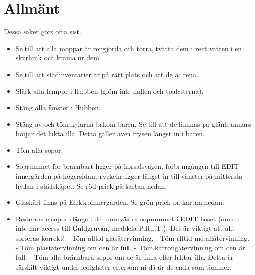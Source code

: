 \section{Allmänt}
Dessa saker görs ofta sist.
\begin{itemize}
    \item Se till att alla moppar är rengjorda och torra, tvätta dem i rent vatten i en skurhink och krama ur dem.
    \item Se till att städinventarier är på rätt plats och att de är rena.
    \item Släck alla lampor i Hubben (glöm inte hallen och toaletterna).
    \item Stäng alla fönster i Hubben.
    \item Stäng av och töm kylarna bakom baren. Se till att de lämnas på glänt, annars börjar det lukta illa! Detta gäller även frysen längst in i baren. 
    \item Töm alla sopor.
    \item Soprummet för brännbart ligger på hörsalsvägen, förbi ingången till EDIT-innergården på högersidan, nyckeln ligger längst in till vänster på mittersta hyllan i städskåpet. Se röd prick på kartan nedan.
    \item Glaskärl finns på Elektroinnergården. Se grön prick på kartan nedan.
    \item Resterande sopor slängs i det nordvästra soprummet i EDIT-huset (om du inte har access till Guldgruvan, meddela P.R.I.T.). Det är viktigt att allt sorteras korrekt! 
    \subitem - Töm alltid glasåtervinning.
    \subitem - Töm alltid metallåtervinning.
    \subitem - Töm plaståtervinning om den är full.
    \subitem - Töm kartongåtervinning om den är full.
    \subitem - Töm alla brännbara sopor om de är fulla eller luktar illa. Detta är särskilt viktigt under ledigheter eftersom ni då är de enda som tömmer. 
    
\end{itemize}


